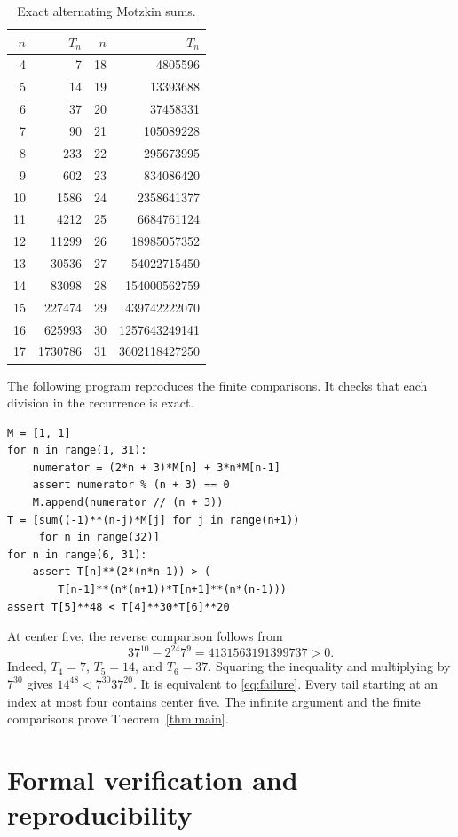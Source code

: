 \documentclass[11pt]{article}
\begin{document}
\begin{table}[ht]
\centering\small
\begin{tabular}{rr@{\qquad}rr}
\toprule
$n$&$T_n$&$n$&$T_n$\\\midrule
4&7&18&4805596\\
5&14&19&13393688\\
6&37&20&37458331\\
7&90&21&105089228\\
8&233&22&295673995\\
9&602&23&834086420\\
10&1586&24&2358641377\\
11&4212&25&6684761124\\
12&11299&26&18985057352\\
13&30536&27&54022715450\\
14&83098&28&154000562759\\
15&227474&29&439742222070\\
16&625993&30&1257643249141\\
17&1730786&31&3602118427250\\\bottomrule
\end{tabular}
\caption{Exact alternating Motzkin sums.}\label{tab:values}
\end{table}

The following program reproduces the finite comparisons. It checks that
each division in the recurrence is exact.
\begin{verbatim}
M = [1, 1]
for n in range(1, 31):
    numerator = (2*n + 3)*M[n] + 3*n*M[n-1]
    assert numerator % (n + 3) == 0
    M.append(numerator // (n + 3))
T = [sum((-1)**(n-j)*M[j] for j in range(n+1))
     for n in range(32)]
for n in range(6, 31):
    assert T[n]**(2*(n*n-1)) > (
        T[n-1]**(n*(n+1))*T[n+1]**(n*(n-1)))
assert T[5]**48 < T[4]**30*T[6]**20
\end{verbatim}

At center five, the reverse comparison follows from
\[
37^{10}-2^{24}7^9=4131563191399737>0.
\]
Indeed, $T_4=7$, $T_5=14$, and $T_6=37$.
Squaring the inequality and multiplying by $7^{30}$ gives
$14^{48}<7^{30}37^{20}$.
It is equivalent to \eqref{eq:failure}.
Every tail starting at an index at most four contains center five.
The infinite argument and the finite comparisons prove
Theorem~\ref{thm:main}.

\section{Formal verification and reproducibility}
\end{document}
